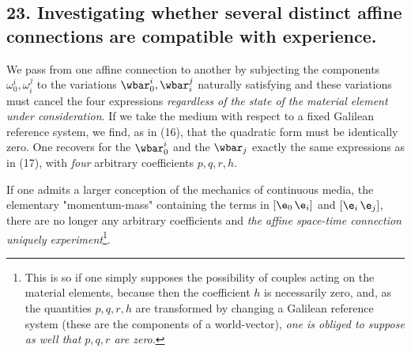\subsection*{23. Investigating whether several distinct affine connections are compatible with experience.} We pass from one affine connection to another by subjecting the components $\omega_0^i, \omega_i^j$ to the variations $\wbar_0^i, \wbar_i^j$ naturally satisfying
and these variations must cancel the four expressions
\textit{regardless of the state of the material element under consideration}. If we take the medium with respect to a fixed Galilean reference system, we find, as in (16), that the quadratic form
must be identically zero. One recovers for the $\wbar_0^i$ and the $\wbar_j$ exactly the same expressions as in (17), with \textit{four} arbitrary coefficients $p, q, r, h$.

If one admits a larger conception of the mechanics of continuous media, the elementary "momentum-mass" containing the terms in $[\e_0\,\e_i]$ and $[\e_i\,\e_j]$, there are no longer any arbitrary coefficients and \textit{the affine space-time connection uniquely  experiment}\footnote{This is so if one simply supposes the possibility of couples acting on the material elements, because then the coefficient $h$ is necessarily zero, and, as the quantities $p, q, r, h$ are transformed by changing a Galilean reference system (these are the components of a world-vector), \textit{one is obliged to suppose as well that $p, q, r$ are zero}.}.

